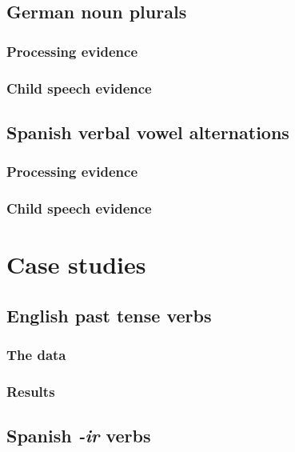 \subsection{German noun plurals}

\subsubsection{Processing evidence}

\subsubsection{Child speech evidence}

\subsection{Spanish verbal vowel alternations}

\subsubsection{Processing evidence}

\subsubsection{Child speech evidence}

\section{Case studies}

\subsection{English past tense verbs}

\subsubsection{The data}

\subsubsection{Results}

\subsection{Spanish \emph{-ir} verbs}

